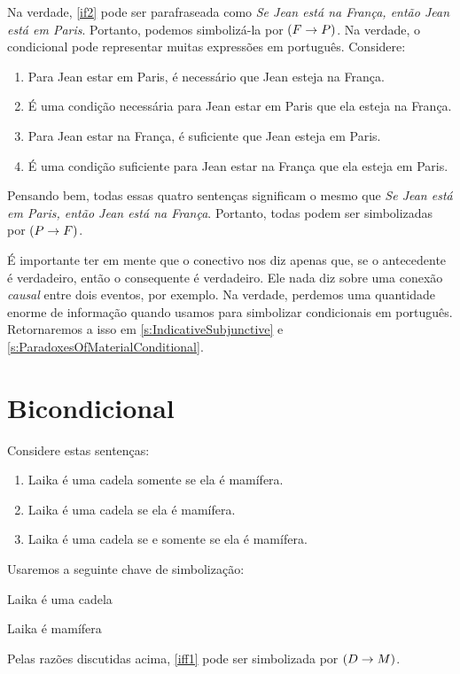 Na verdade, \cref*{if2} pode ser parafraseada como \emph{Se Jean está na
França, então Jean está em Paris}. Portanto, podemos simbolizá-la por
$(F \rightarrow P)$.
\noindent Na verdade, o condicional pode representar muitas expressões
em português. Considere:
	\begin{enumerate}
		\item\label{ifnec1}Para Jean estar em Paris, é necessário que Jean esteja na França.
		\item\label{ifnec2}É uma condição necessária para Jean estar em Paris que ela esteja na França.
		\item\label{ifsuf1}Para Jean estar na França, é suficiente que Jean esteja em Paris.
		\item\label{ifsuf2}É uma condição suficiente para Jean estar na França que ela esteja em Paris.
	\end{enumerate}
Pensando bem, todas essas quatro sentenças significam o mesmo que
\emph{Se Jean está em Paris, então Jean está na França}. Portanto, todas
podem ser simbolizadas por $(P \rightarrow F)$.

É importante ter em mente que o conectivo \eif nos diz apenas que, se o
antecedente é verdadeiro, então o consequente é verdadeiro. Ele nada diz
sobre uma conexão \emph{causal} entre dois eventos, por exemplo. Na
verdade, perdemos uma quantidade enorme de informação quando usamos
\eif para simbolizar condicionais em português. Retornaremos a isso em
\cref{s:IndicativeSubjunctive} e \cref{s:ParadoxesOfMaterialConditional}.

\section{Bicondicional}
Considere estas sentenças:
	\begin{enumerate}
		\item\label{iff1}Laika é uma cadela somente se ela é mamífera.
		\item\label{iff2}Laika é uma cadela se ela é mamífera.
		\item\label{iff3}Laika é uma cadela se e somente se ela é mamífera.
	\end{enumerate}
Usaremos a seguinte chave de simbolização:
	\begin{ekey}
		\item[D] Laika é uma cadela
		\item[M] Laika é mamífera
	\end{ekey}
Pelas razões discutidas acima, \cref*{iff1} pode ser simbolizada por
$(D \rightarrow M)$.


